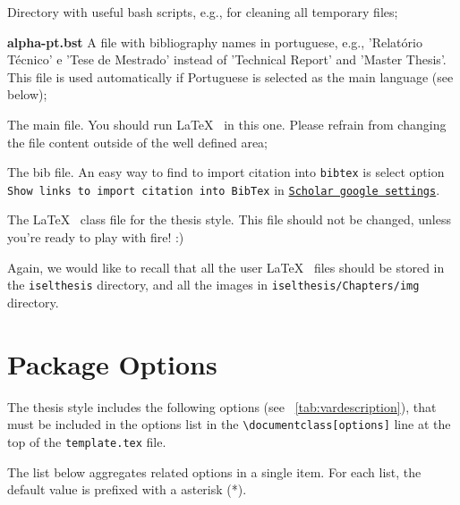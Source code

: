 \begin{description}
\begin{description}
		\item[Scripts] Directory with useful bash scripts, e.g., for cleaning all temporary files;
		\item \textbf{alpha-pt.bst} A file with bibliography names in portuguese, e.g., 'Relatório Técnico' e 'Tese de Mestrado' instead of 'Technical Report' and 'Master Thesis'. This file is used automatically if Portuguese is selected as the main language (see below);
		\item[template.tex] The main file. You should run  \LaTeX~ in this one. Please refrain from changing the file content outside of the well defined area;
		\item[bibliography.bib] The bib file. An easy way to find to import citation into \texttt{bibtex} is select option \texttt{Show links to import citation into
Bib\-Tex} in \href{http://scholar.google.pt/scholar_settings?hl=en&as_sdt=0,5}{\texttt{Scholar google settings}}.
		\item[iselthesis.cls] The  \LaTeX~ class file for the thesis{} style. {\color{red}This file should not be changed}, unless you're ready to play with fire! :)
	\end{description}
\end{description}

Again, we would like to recall that all the user \LaTeX~ files should be stored in the \verb!iselthesis! directory, and all the images in \verb!iselthesis/Chapters/img! directory.

\section{Package Options} %
\label{sec:package_options}

The thesis style includes the following options (see \tablename~\ref{tab:vardescription}), that must be included in the options list in the \verb|\documentclass[options]| line at the top of the \texttt{template.tex} file.

The list below aggregates related options in a single item. For each list, the default value is prefixed with a asterisk (*).

